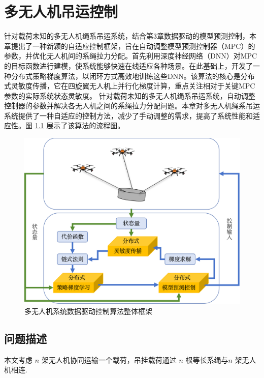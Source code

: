 \documentclass[lang=chs, degree=master, blindreview=false, winfonts=true]{yanputhesis}
\begin{document}
\cleardoublepage

\chapter{多无人机吊运控制}

针对载荷未知的多无人机绳系吊运系统，结合第3章数据驱动的模型预测控制，本章提出了一种新颖的自适应控制框架，旨在自动调整模型预测控制器（MPC）的参数，并优化无人机间的系绳拉力分配。首先利用深度神经网络（DNN）对MPC的目标函数进行建模，使系统能够快速在线适应各种场景。在此基础上，开发了一种分布式策略梯度算法，以闭环方式高效地训练这些DNN。该算法的核心是分布式灵敏度传播，它在四旋翼无人机上并行化梯度计算，重点关注相对于关键MPC参数的实际系统状态灵敏度。
针对载荷未知的多无人机绳系吊运系统，自动调整控制器的参数并解决各无人机之间的系绳拉力分配问题。本章对多无人机绳系吊运系统提供了一种自适应的控制方法，减少了手动调整的需求，提高了系统性能和适应性。图 \ref{4_1} 展示了该算法的流程图。

\begin{figure}[hbt!]
	\centering
	\includegraphics[width=38pc]{picture/4_1.png} 
	\caption{多无人机系统数据驱动控制算法整体框架} 
	\label{4_1}
\end{figure}


\section{问题描述}
本文考虑 $n$ 架无人机协同运输一个载荷，吊挂载荷通过 $n$ 根等长系绳与$n$ 架无人机相连.
\end{document}
